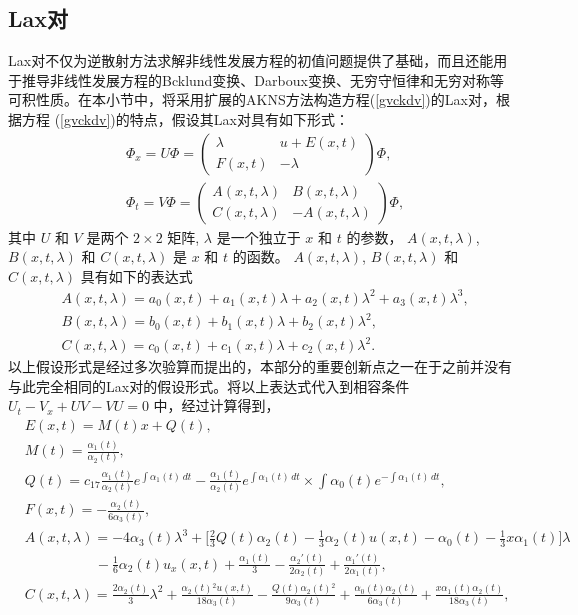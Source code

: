 \subsection{Lax对}
Lax对不仅为逆散射方法求解非线性发展方程的初值问题提供了基础，而且还能用于推导非线性发展方程的Bcklund变换、Darboux变换、无穷守恒律和无穷对称等可积性质。在本小节中，将采用扩展的AKNS方法构造方程(\ref{gvckdv})的Lax对，根据方程 (\ref{gvckdv})的特点，假设其Lax对具有如下形式：
\begin{align}
& \Phi_x=U \Phi=
\begin{pmatrix}
\lambda & u+E(x,t)\\
F(x,t) & -\lambda
\end{pmatrix}\Phi,\label{lp1}\\
& \Phi_t=V \Phi=
\begin{pmatrix}
A(x,t,\lambda) & B(x,t,\lambda)\\
C(x,t,\lambda) & -A(x,t,\lambda)
\end{pmatrix}\Phi,\label{lp2}
\end{align}
其中 $U$ 和 $V$ 是两个 $2 \times 2$ 矩阵,
 $\lambda$ 是一个独立于 $x$ 和 $t$ 的参数，
$A(x,t,\lambda)$, $B(x,t,\lambda)$ 和 $C(x,t,\lambda)$ 是
$x$ 和 $t$ 的函数。  $A(x,t,\lambda)$,
$B(x,t,\lambda)$ 和 $C(x,t,\lambda)$ 具有如下的表达式
\begin{align}
&A(x,t,\lambda )=a_0(x,t)+a_1(x,t)\lambda  + a_2(x,t)\lambda^2
+ a_3(x,t)\lambda^3 ,\\
&B(x,t,\lambda )=b_0(x,t)+b_1(x,t)\lambda  + b_2(x,t)\lambda^2 ,\\
&C(x,t,\lambda )=c_0(x,t)+c_1(x,t)\lambda  + c_2(x,t)\lambda^2.
\end{align}
以上假设形式是经过多次验算而提出的，本部分的重要创新点之一在于之前并没有与此完全相同的Lax对的假设形式。将以上表达式代入到相容条件 $U_t - V_x + U V - V U = 0$ 中，经过计算得到，
\begin{align}
& E(x,t)=M(t)x+Q(t),\label{et} \\
& M(t)=\frac{\alpha _1(t)}{\alpha _2(t)}, \label{mt}\\
& Q(t)=c_{17} \frac{\alpha _1(t)}{\alpha _2(t)} e^ {\int
\alpha _1(t) \, dt}
 -\frac{\alpha _1(t)}{\alpha _2(t)} e^ {\int
\alpha _1(t) \, dt}\times
 \int \alpha _0(t) e^ {-\int
\alpha _1(t) \, dt},\label{qt}\\
& F(x,t)=-\frac{\alpha _2(t)}{6 \alpha _3(t)}, \label{F}\\
\nonumber
& A(x,t,\lambda )=-4 \alpha _3(t)\lambda^3+\big[\frac{2}{3} Q(t) \alpha _2(t)
-\frac{1}{3} \alpha _2(t) u(x,t)
-\alpha _0(t)-\frac{1}{3} x \alpha _1(t)\big]\lambda   \\
& \qquad \qquad \quad -\frac{1}{6} \alpha _2(t) u_{x}(x,t)
+\frac{\alpha _1(t)}{3}-\frac{\alpha _2'(t)}{2\alpha _2(t)}+\frac{\alpha _1'(t)}{2\alpha _1(t)}
  ,\\
&  C(x,t,\lambda )=\frac{2 \alpha _2(t)}{3}\lambda^2+
\frac{\alpha _2(t){}^2 u(x,t)}{18 \alpha _3(t)}-\frac{Q(t) \alpha _2(t){}^2}{9 \alpha _3(t)}
+\frac{\alpha _0(t) \alpha _2(t)}{6 \alpha _3(t)}
+\frac{x \alpha _1(t) \alpha _2(t)}{18 \alpha _3(t)}
 , \label{ct}
\end{align}
